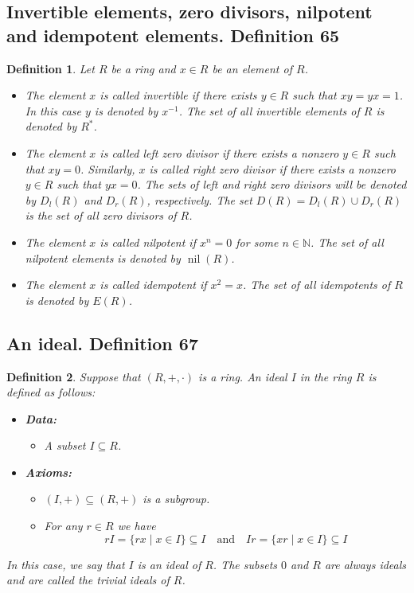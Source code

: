 \documentclass{article}
\newtheorem*{customdefinition}{Definition}
\begin{document}
\subsection*{Invertible elements, zero divisors, nilpotent and idempotent elements. Definition 65}
\begin{customdefinition}
Let \( R \) be a ring and \( x \in R \) be an element of \( R \).

\begin{itemize}
    \item The element \( x \) is called invertible if there exists \( y \in R \) such that \( xy = yx = 1 \). In this case \( y \) is denoted by \( x^{-1} \). The set of all invertible elements of \( R \) is denoted by \( R^* \).
    
    \item The element \( x \) is called left zero divisor if there exists a nonzero \( y \in R \) such that \( xy = 0 \). Similarly, \( x \) is called right zero divisor if there exists a nonzero \( y \in R \) such that \( yx = 0 \). The sets of left and right zero divisors will be denoted by \( D_l(R) \) and \( D_r(R) \), respectively. The set \( D(R) = D_l(R) \cup D_r(R) \) is the set of all zero divisors of \( R \).
    
    \item The element \( x \) is called nilpotent if \( x^n = 0 \) for some \( n \in \mathbb{N} \). The set of all nilpotent elements is denoted by \( \operatorname{nil}(R) \).
    
    \item The element \( x \) is called idempotent if \( x^2 = x \). The set of all idempotents of \( R \) is denoted by \( E(R) \).
\end{itemize}
\end{customdefinition}

\subsection*{An ideal. Definition 67}
\begin{customdefinition}
Suppose that $(R,+, \cdot)$ is a ring. An ideal $I$ in the ring $R$ is defined as follows:
\begin{itemize}
    \item \textbf{Data:}
        \begin{itemize}
            \item A subset $I \subseteq R$.
        \end{itemize}
    \item \textbf{Axioms:}
        \begin{itemize}
            \item $(I,+) \subseteq (R,+)$ is a subgroup.
            \item For any $r \in R$ we have
                \[
                r I = \{rx\mid x\in I\} \subseteq I\quad\text{and}\quad Ir = \{xr\mid x\in I\}\subseteq I
                \]
        \end{itemize}
\end{itemize}
In this case, we say that $I$ is an ideal of $R$. The subsets $0$ and $R$ are always ideals and are called the trivial ideals of $R$.
\end{customdefinition}
\end{document}
